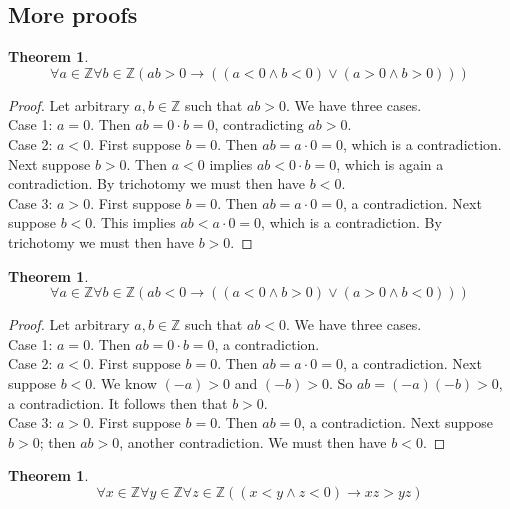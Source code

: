 \documentclass{report}
\newtheorem{theorem}[theo]{Theorem}
\begin{document}
\subsection{More proofs}
\begin{theorem}\label{mp_1}
\begin{equation*}
\forall a\in\mathbb Z\forall b\in\mathbb Z(ab>0\to((a<0\land b<0)\lor(a>0\land b>0)))
\end{equation*}
\end{theorem}
\begin{proof}
Let arbitrary $a,b\in\mathbb Z$ such that $ab>0$. We have three cases.\\
\indent Case 1: $a=0$. Then $ab=0\cdot b=0$, contradicting $ab>0$.\\
\indent Case 2: $a<0$. First suppose $b=0$. Then $ab=a\cdot0=0$, which is a contradiction.
Next suppose $b>0$. Then $a<0$ implies $ab<0\cdot b=0$, which is again a contradiction. 
By trichotomy we must then have $b<0$.\\
\indent Case 3: $a>0$. First suppose $b=0$. Then $ab=a\cdot0=0$, a contradiction.
Next suppose $b<0$. This implies $ab<a\cdot0=0$, which is a contradiction.
By trichotomy we must then have $b>0$.
\end{proof}
\begin{theorem}\label{mp_2}
\begin{equation*}
\forall a\in\mathbb Z\forall b\in\mathbb Z(ab<0\to((a<0\land b>0)\lor(a>0\land b<0)))
\end{equation*}
\end{theorem}
\begin{proof}
Let arbitrary $a,b\in\mathbb Z$ such that $ab<0$. We have three cases.\\
\indent Case 1: $a=0$. Then $ab=0\cdot b=0$, a contradiction.\\
\indent Case 2: $a<0$. First suppose $b=0$. Then $ab=a\cdot0=0$, a contradiction. Next suppose $b<0$. We know $(-a)>0$ and $(-b)>0$. So $ab=(-a)(-b)>0$, a contradiction. It follows then that $b>0$.\\
\indent Case 3: $a>0$. First suppose $b=0$. Then $ab=0$, a contradiction. Next suppose $b>0$; then $ab>0$, another contradiction. We must then have $b<0$.
\end{proof}
\begin{theorem}\label{mp_3}
\begin{equation*}
\forall x\in\mathbb Z\forall y\in\mathbb Z\forall z\in\mathbb Z((x<y\land z<0)\to xz>yz)
\end{equation*}
\end{theorem}
\end{document}
